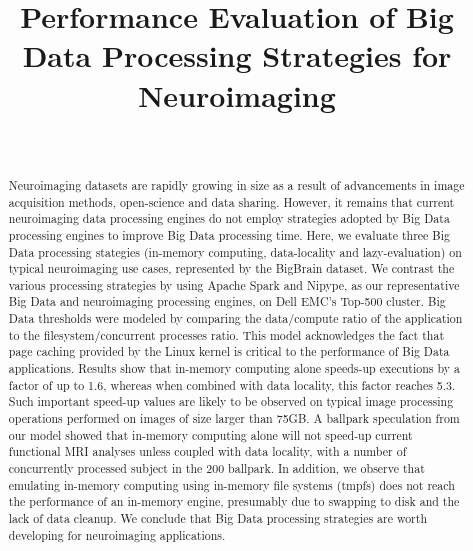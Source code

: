 \documentclass{IEEEtran}
\begin{document}
\title{Performance Evaluation of Big Data Processing Strategies for Neuroimaging}

\author{
  \\
}

\maketitle

\begin{abstract}
    Neuroimaging datasets are rapidly growing in size as a result of 
    advancements in image acquisition methods, open-science and data sharing. 
    However, it remains that current neuroimaging data processing engines do 
    not employ strategies adopted by Big Data processing engines to improve 
    Big Data processing time. Here, we 
    evaluate three Big Data processing stategies (in-memory computing, 
    data-locality and lazy-evaluation) on typical neuroimaging use 
    cases, represented by the BigBrain dataset. We contrast the various 
    processing strategies by using Apache Spark and Nipype, as our 
    representative Big Data and neuroimaging processing engines, on Dell EMC's 
    Top-500 cluster. 
    Big Data thresholds were modeled by comparing the data/compute ratio of the 
    application to the filesystem/concurrent processes ratio. 
    This model acknowledges the 
fact that page caching provided by the Linux kernel is critical to the 
performance of Big Data applications. Results show that in-memory 
computing alone speeds-up executions by a factor of up to 1.6, whereas 
when combined with data locality, this factor reaches 5.3. Such important 
speed-up values are likely to be observed on typical image processing 
operations performed on images of size larger than 75GB. A ballpark 
speculation from our model showed that in-memory computing alone will
not speed-up current 
functional MRI analyses unless coupled with data 
locality, with a number of concurrently processed subject in the  200 ballpark. 
    In addition, we observe that emulating in-memory computing 
using in-memory file systems (tmpfs) does not reach the performance of 
an in-memory engine, presumably due to swapping to disk and the lack of data cleanup.
We conclude that Big Data processing strategies are 
worth developing for neuroimaging 
applications. 
\end{abstract}
\end{document}
